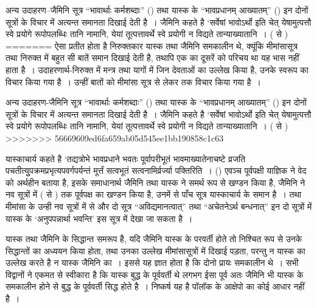 अन्य उदाहरण–जैमिनि सूत्र “भावार्थाः कर्मशब्दाः” () तथा यास्क के “भावप्रधानम् आख्यातम्” () इन दोनों सूत्रों के विचार में अत्यन्त समानता दिखाई देती है~। जैमिनि कहते है ‘सर्वेषां भावोऽर्थो इति चेत् येषामुत्पत्तौ स्वे प्रयोगे रूपोपलब्धिः तानि नामानि, येयां तूत्पत्तावर्थे स्वे प्रयोगी न विद्यते तान्याख्यातानि~। ( से )
=======
ऐसा प्रतीत होता है निरुक्तकार यास्क तथा जैमिनि समकालीन थे, क्यूंकि मीमांसासूत्र तथा निरुक्त में बहुत सी बातें समान दिखाई देती है, तथापि एक का दूसरें को परिचय था यह भास नहीं हाता है~। उदाहरणार्थ-निरुक्त  में मन्त्र तथा यागों में जिन देवताओं का उल्लेख किया है, उनके स्वरूप का विचार किया गया है~। उन्हीं बातों को मीमांसा सूत्र  से लेकर  तक विचार किया गया है~। 

अन्य उदाहरण-जैमिनि सूत्र “भावार्थाः कर्मशब्दाः” () तथा यास्क के “भावप्रधानम् आख्यातम्” () इन दोनों सूत्रों के विचार में अत्यन्त समानता दिखाई देती है~। जैमिनि कहते है ‘सर्वेषां भावोऽर्थो इति चेत् येषामुत्पत्तौ स्वे प्रयोगे रूपोपलब्धिः तानि नामानि, येयां तूत्पत्तावर्थे स्वे प्रयोगी न विद्यते तान्याख्यातानि~। ( से )
>>>>>>> 56669609ed6fa659ab05d545ee1bb190858c1c63

यास्काचार्य कहते है ‘तद्यत्रोभे भावप्रधाने भवतः पूर्वापरीभूतं भावमाख्यातेनाचष्टे व्रजति पचतीत्युुपक्रमप्रभृत्यपवर्गपर्यन्तं मूर्त्तं सत्वभूतं सत्वनामिर्व्रर्ज्या पक्तिरिति~। () एवञ्च पूर्वपक्षी याज्ञिक ने वेद को अर्थहीन बताया है, इसके समाधानार्थ जैमिनि तथा यास्क ने समर्थ रूप से खण्डन किया है, जैमिनि ने नव सूत्रों में ( से ) तक पूर्वपक्ष का खण्डन किया है, उनमें से पाँच सूत्र यास्काचार्य के समान है~। तथा मीमांसा के उन्ही नव सूत्रों में से और दो सूत्र “अविद्यमानत्वात्” तथा “अचेतनेऽर्थ बन्धनात्” इन दो सूत्रों में यास्क के ‘अनुपपन्नार्था भवन्ति' इस सूत्र में देखा जा सकता है~।

यास्क तथा जैमिनि के सिद्धान्त समरूप है, यदि जैमिनि यास्क के परवर्ती होते तो निश्चित रूप से उनके सिद्धान्तों का अध्ययन किया होता, तथा उनका उल्लेख मीमांसासूत्रों में दिखाई पड़ता, परन्तु न यास्क का उल्लेख करते है न यास्क जैमिनि का~। इससे यह ज्ञात होता है कि दोनो प्रायः समकालीन थे~। सभी विद्वानों ने एकमत से स्वीकारा है कि यास्क बुद्ध के पूर्ववर्ती थे लगभग  ईसा पूर्व अतः जैमिनि भी यास्क के समकालीन होने से बुद्ध के पूर्ववर्ती सिद्ध होते है~। निष्कर्ष यह है पॉलॉक के आक्षेपो का कोई आधार नहीं है~।


